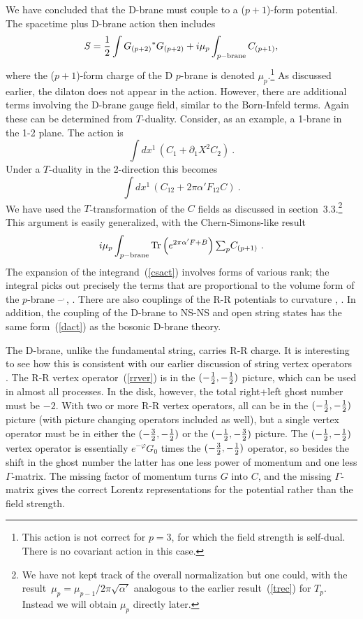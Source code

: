 \documentclass[12pt]{article}
\def\be{\begin{equation}}
\def\ee{\end{equation}}
\def\ap{\alpha'}
\def\apm{\alpha'}
\def\ha{{\textstyle{1\over 2}}}
\begin{document}
We have concluded that the D-brane must couple to a ($p + 1$)-form
potential.  The spacetime plus D-brane action
then includes
\be
S={1\over2}\int G_{(p+2)}{}^*G_{(p+2)}+i\mu_p\int_{p-\rm brane} C_{(p+1)},
\label{formaction}
\ee
where the ($p + 1$)-form charge of the D $p$-brane is
denoted $\mu_p$.\footnote{This action is not correct for $p=3$, for which
the field strength is self-dual. There is no covariant action in this case.}
As discussed earlier, the dilaton does not appear in the action.  However,
there are additional terms involving the D-brane gauge field, similar to
the Born-Infeld terms.  Again these can be determined from $T$-duality.
Consider, as an example, a 1-brane in the 1-2 plane.  The action is
\be
\int dx^1\, \left( C_1 + \partial_1 X^2 C_2\right)\ .
\ee
Under a $T$-duality in the 2-direction this becomes
\be
\int dx^1\, \left( C_{12} + 2\pi\apm F_{12} C
\right)\ . \label{rrf}
\ee
We have used the $T$-transformation of the $C$ fields as discussed in
section~3.3.\footnote{We have not kept track of the overall normalization but
one could, with the result~$\mu_p = \mu_{p-1}/2\pi\sqrt{{\ap}}$ analogous to
the earlier result~(\ref{trec}) for $T_p$.  Instead we will obtain $\mu_p$
directly later.}  This argument is easily generalized, with the
Chern-Simons-like result
\be
i\mu_p\int_{p-\rm brane}  {\rm Tr}\left(e^{2\pi\apm F + B}\right)
\textstyle{\sum}_p C_{(p+1)} \ . \label{csact}
\ee
The expansion of the integrand~(\ref{csact}) involves forms of various rank;
the integral picks out precisely the terms
that are proportional to the volume form of the
$p$-brane \cite{rract}--\cite{douginst}$
^{\!,\,}$\cite{tdbi}, \cite{tdtp}.  There are also couplings of the R-R
potentials to curvature \cite{bsv}, \cite{ghs}.  In addition, the
coupling of the D-brane to NS-NS and open string states has the same
form~(\ref{dact}) as the bosonic D-brane theory.

The D-brane, unlike the fundamental string, carries R-R charge.  It
is interesting to see how this is consistent with our earlier discussion
of string vertex operators \cite{bpspict}.
The R-R vertex operator~(\ref{rrver}) is in the
$(-\ha ,-\ha)$ picture, which can be used in almost all processes.  In
the disk, however, the total right+left ghost number must be $-2$.  With
two or more R-R vertex operators, all can be in the $(-\ha ,-\ha)$
picture (with picture changing operators included as well), but a single
vertex operator must be in either the $(-{3\over 2}, -\ha)$ or the
$(-\ha,-{3\over 2})$ picture.  The  $(-\ha ,-\ha)$ vertex operator is
essentially $e^{-\varphi} G_0$ times the $(-{3\over 2}, -\ha)$ operator,
so besides the shift in the ghost number the latter has one less power of
momentum and one less $\Gamma$-matrix. The missing factor of momentum
turns $G$ into $C$, and the missing $\Gamma$-matrix gives the correct
Lorentz representations for the potential rather than the field strength.
\end{document}
